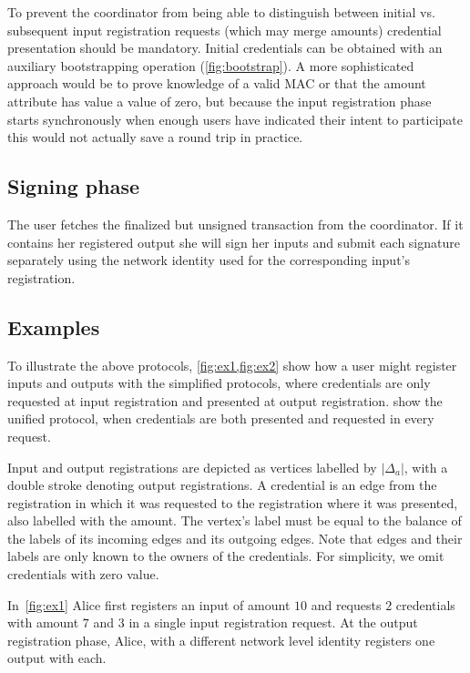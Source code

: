 \documentclass[a4paper]{article}
\begin{document}
To prevent the coordinator from being able to distinguish between initial vs. subsequent input registration requests (which may merge amounts) credential presentation should be mandatory. Initial credentials can be obtained with an auxiliary bootstrapping operation (\cref{fig:bootstrap}). A more sophisticated approach would be to prove knowledge of a valid MAC or that the amount attribute has value a value of zero, but because the input registration phase starts synchronously when enough users have indicated their intent to participate this would not actually save a round trip in practice.

\subsection{Signing phase}

The user fetches the finalized but unsigned transaction from the coordinator. If it contains her registered output she will sign her inputs and submit each signature separately using the network identity used for the corresponding input's registration.

\subsection{Examples}\label{sec:examples}

To illustrate the above protocols, \cref{fig:ex1,fig:ex2} show how a user might register inputs and outputs with the simplified protocols, where credentials are only requested at input registration and presented at output registration.  show the unified protocol, when credentials are both presented and requested in every request.

Input and output registrations are depicted as vertices labelled by $|\Delta_a|$, with a double stroke denoting output registrations. A credential is an edge from the registration in which it was requested to the registration where it was presented, also labelled with the amount. The vertex's label must be equal to the balance of the labels of its incoming edges and its outgoing edges. Note that edges and their labels are only known to the owners of the credentials. For simplicity, we omit credentials with zero value.

In~\cref{fig:ex1} Alice first registers an input of amount $10$ and requests $2$ credentials with amount $7$ and $3$ in a single input registration request. At the output registration phase, Alice, with a different network level identity registers one output with each.
\end{document}
